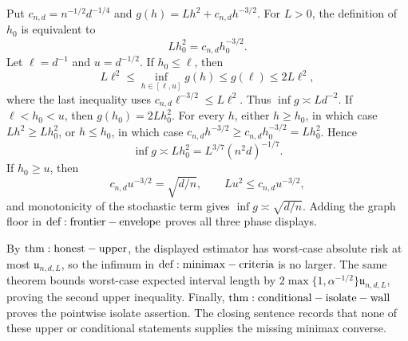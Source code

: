 Put \(c_{n,d}=n^{-1/2}d^{-1/4}\) and \(g(h)=Lh^2+c_{n,d}h^{-3/2}\).  For \(L>0\), the definition of \(h_0\) is equivalent to
\[
 Lh_0^2=c_{n,d}h_0^{-3/2}.
\]
Let \(\ell=d^{-1}\) and \(u=d^{-1/2}\).  If \(h_0\leq\ell\), then
\[
 L\ell^2\leq\inf_{h\in[\ell,u]}g(h)\leq g(\ell)\leq2L\ell^2,
\]
where the last inequality uses \(c_{n,d}\ell^{-3/2}\leq L\ell^2\).  Thus \(\inf g\asymp Ld^{-2}\).  If \(\ell<h_0<u\), then \(g(h_0)=2Lh_0^2\).  For every \(h\), either \(h\geq h_0\), in which case \(Lh^2\geq Lh_0^2\), or \(h\leq h_0\), in which case \(c_{n,d}h^{-3/2}\geq c_{n,d}h_0^{-3/2}=Lh_0^2\).  Hence
\[
 \inf g\asymp Lh_0^2=L^{3/7}(n^2d)^{-1/7}.
\]
If \(h_0\geq u\), then
\[
 c_{n,d}u^{-3/2}=\sqrt{d/n},
 \qquad Lu^2\leq c_{n,d}u^{-3/2},
\]
and monotonicity of the stochastic term gives \(\inf g\asymp\sqrt{d/n}\).  Adding the graph floor in \({\rm def:frontier-envelope}\) proves all three phase displays.

By \({\rm thm:honest-upper}\), the displayed estimator has worst-case absolute risk at most \(\mathfrak u_{n,d,L}\), so the infimum in \({\rm def:minimax-criteria}\) is no larger.  The same theorem bounds worst-case expected interval length by \(2\max\{1,\alpha^{-1/2}\}\mathfrak u_{n,d,L}\), proving the second upper inequality.  Finally, \({\rm thm:conditional-isolate-wall}\) proves the pointwise isolate assertion.  The closing sentence records that none of these upper or conditional statements supplies the missing minimax converse.